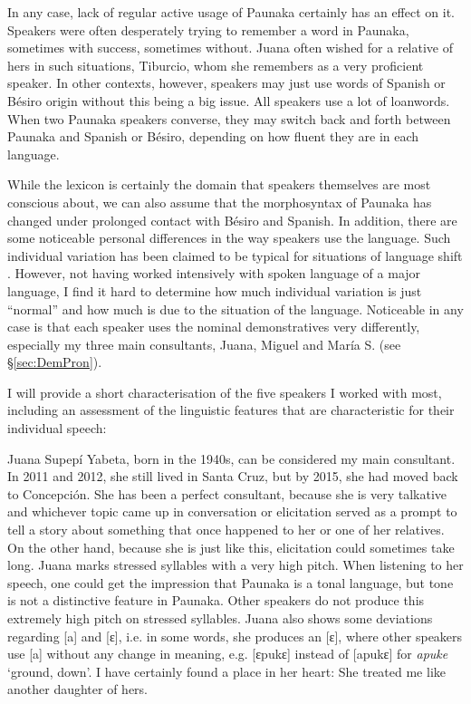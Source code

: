 In any case, lack of regular active usage of Paunaka certainly has an effect on it. Speakers were often desperately trying to remember a word in Paunaka, sometimes with success, sometimes without. Juana often wished for a relative of hers in such situations, Tiburcio, whom she remembers as a very proficient speaker. In other contexts, however, speakers may just use words of Spanish or Bésiro origin without this being a big issue. All speakers use a lot of loanwords. When two Paunaka speakers converse, they may switch back and forth between Paunaka and Spanish or Bésiro, depending on how fluent they are in each language. 

While the lexicon is certainly the domain that speakers themselves are most conscious about, we can also assume that the morphosyntax of Paunaka has changed under prolonged contact with Bésiro and Spanish. In addition, there are some noticeable personal differences in the way speakers use the language. Such individual variation has been claimed to be typical for situations of language shift \citep[cf.][111--112]{PalosaariCampbell2011}. However, not having worked intensively with spoken language of a major language, I find it hard to determine how much individual variation is just “normal” and how much is due to the situation of the language. Noticeable in any case is that each speaker uses the nominal demonstratives very differently, especially my three main consultants, Juana, Miguel and María S. (see §\ref{sec:DemPron}).

I will provide a short characterisation of the five speakers I worked with most, including an assessment of the linguistic features that are characteristic for their individual speech:

Juana Supepí Yabeta, born in the 1940s, can be considered my main consultant. In 2011 and 2012, she still lived in Santa Cruz, but by 2015, she had moved back to Concepción. She has been a perfect consultant, because she is very talkative and whichever topic came up in conversation or elicitation served as a prompt to tell a story about something that once happened to her or one of her relatives. On the other hand, because she is just like this, elicitation could sometimes take long. Juana marks stressed syllables with a very high pitch. When listening to her speech, one could get the impression that Paunaka is a tonal language, but tone is not a distinctive feature in Paunaka. Other speakers do not produce this extremely high pitch on stressed syllables. Juana also shows some deviations regarding [a] and [ɛ], i.e. in some words, she produces an [ɛ], where other speakers use [a] without any change in meaning, e.g. [ɛpukɛ] instead of [apukɛ] for \textit{apuke} ‘ground, down’. I have certainly found a place in her heart: She treated me like another daughter of hers.

